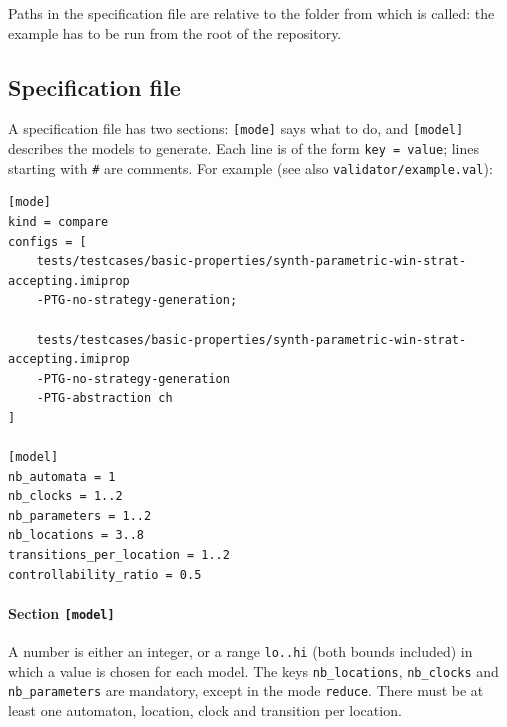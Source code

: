 Paths in the specification file are relative to the folder from which \validator{} is called: the example has to be run from the root of the repository.

\subsection{Specification file}

A specification file has two sections: \texttt{[mode]} says what to do, and \texttt{[model]} describes the models to generate.
Each line is of the form \texttt{key = value}; lines starting with \texttt{\#} are comments.
For example (see also \texttt{validator/example.val}):

\begin{verbatim}
[mode]
kind = compare
configs = [
    tests/testcases/basic-properties/synth-parametric-win-strat-accepting.imiprop
    -PTG-no-strategy-generation;

    tests/testcases/basic-properties/synth-parametric-win-strat-accepting.imiprop
    -PTG-no-strategy-generation
    -PTG-abstraction ch
]

[model]
nb_automata = 1
nb_clocks = 1..2
nb_parameters = 1..2
nb_locations = 3..8
transitions_per_location = 1..2
controllability_ratio = 0.5
\end{verbatim}

\paragraph{Section \texttt{[model]}}
A number is either an integer, or a range \texttt{lo..hi} (both bounds included) in which a value is chosen for each model.
The keys \texttt{nb\_locations}, \texttt{nb\_clocks} and \texttt{nb\_parameters} are mandatory, except in the mode \texttt{reduce}.
There must be at least one automaton, location, clock and transition per location.

